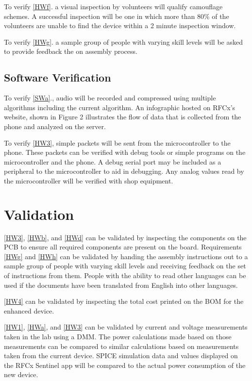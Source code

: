 \documentclass{article}
\numberwithin{figure}{section}
\numberwithin{equation}{section}
\begin{document}
{To verify \ref{HWf}. a visual inspection by volunteers will qualify camouflage schemes. A successful inspection will be one in which more than 80\% of the volunteers are unable to find the device within a 2 minute inspection window.

To verify \ref{HWg}. a sample group of people with varying skill levels will be asked to provide feedback the on assembly process.

\subsection{Software Verification} \label{sect:softwareverification}
To verify \ref{SWa}., audio will be recorded and compressed using multiple algorithms including the current algorithm. An infographic hosted on RFCx’s website, shown in Figure 2 illustrates the flow of data that is collected from the phone and analyzed on the server.

To verify \ref{HW3}, simple packets will be sent from the microcontroller to the phone. These packets can be verified with debug tools or simple programs on the microcontroller and the phone. A debug serial port may be included as a peripheral to the microcontroller to aid in debugging. Any analog values read by the microcontroller will be verified with shop equipment.

\section{Validation} \label{sect:validation}
\ref{HW3}, \ref{HWb}, and \ref{HWd} can be validated by inspecting the components on the PCB to ensure all required components are present on the board. Requirements \ref{HWg} and \ref{HWh} can be validated by handing the assembly instructions out to a sample group of people with varying skill levels and receiving feedback on the set of instructions from them. People with the ability to read other languages can be used if the documents have been translated from English into other languages.

\ref{HW4} can be validated by inspecting the total cost printed on the BOM for the enhanced device.

\ref{HW1}, \ref{HWa}, and \ref{HW3} can be validated by current and voltage measurements taken in the lab using a DMM. The power calculations made based on those measurements can be compared to similar calculations based on measurements taken from the current device. SPICE simulation data and values displayed on the RFCx Sentinel app will be compared to the actual power consumption of the new device.

}
\end{document}
